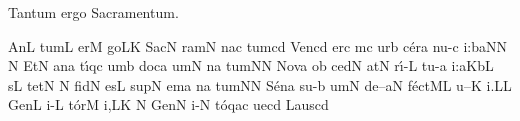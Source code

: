 \beginhymn Tantum ergo Sacramentum.


\Internote
\nosolesmescustos
\initiumgregorianum
%
\sgn {}An\punctum L\egn
\sgn tum\punctum L\egn
\spatium
\sgn {}er\punctum M\egn
\sgn go{}\clivis LK\egn
\spatium
\sgn Sac\punctum N\egn
\sgn ram\punctum N\egn
{}n\pes ac\egn
\sgn tum\punctum c\augmentum d\egn
\spatium
\divisiominima
\spatium
\sgn V{e}n\pes cd\egn
\sgn {}er\punctum c\egn
{}m\punctum c\egn
\sgn {}ur\punctum b\egn
\spatium
\sgn c{\'e}r\punctum a\egn
\sgn nu{-}\punctum c\egn
\sgn {}i{:}\climacus baN\augmentum N\egn
\spatium
\divisiominor
\custos N
\lineaproxima
\spatium
\sgn {}Et\punctum N\egn
\spatium
\sgn {}an\punctum a\egn
\sgn t{\'\i}q\punctum c\egn
{}um\punctum b\egn
\spatium
\sgn doc\punctum a\egn
\sgn {}um\punctum N\egn
{}n\punctum a\egn
\sgn tum\punctum N\augmentum N\egn
\spatium
\divisiominima
\spatium
\sgn N{o}v\punctum a\egn
\sgn {}o{}\punctum b\egn
\spatium
\sgn c{e}d\punctum N\egn
\sgn {}at\punctum N\egn
\spatium
\sgn r{\'\i}{-}\punctum L\egn
\sgn tu{-}\punctum a\egn
\sgn {}i{:}\clivis aK\augmentumduplex bL\egn
\spatium
\divisiominor
\spatium
s\punctum L\egn
\sgn tet\punctum N\egn
\spatium
\custos N
\lineaproxima
\sgn f{i}d\punctum N\egn
\sgn {}es\punctum L\egn
\spatium
\sgn sup\punctum N\egn
{}em\punctum a\egn
{}n\punctum a\egn
\sgn tum\punctum N\augmentum N\egn
\spatium
\divisiominima
\spatium
\sgn S{\'e}n\punctum a\egn
\sgn su{-}\punctum b\egn
\sgn {}um\punctum N\egn
\spatium
\sgn de{--}\clivis aN\egn
\sgn f{\'e}{ct}\clivis ML\egn
\sgn {}u{--}\punctum K\egn
\sgn {}i{.}\punctum L\augmentum L\egn
\spatium
\divisiofinalis
\spatium
\sgn Gen\punctum L\egn
\sgn {}i{-}\punctum L\egn
\sgn t{\'o}r\punctum M\egn
\sgn {}i,\clivis LK\egn
\spatium
\custos N
\lineaproxima
\sgn Gen\punctum N\egn
\sgn {}i{-}\punctum N\egn
\sgn t{\'o}q\pes ac\egn
\sgn ue{}\punctum c\augmentum d\egn
\spatium
\divisiominima
\spatium
\sgn L{au}s\pes cd\egn
